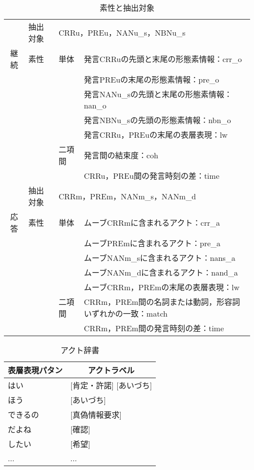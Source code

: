 \begin{description}
\begin{table}[tbt]
 \begin{center}
   \caption{素性と抽出対象}

\begin{tabular}{|c|l|l|l|}
\hline
     & 抽出対象 & \multicolumn{2}{|l|}{CRRu，PREu，NANu\_s，NBNu\_s                                                                                        }\\
\cline{2-2}\cline{3-3}\cline{4-4}継続 & 素性         & 単体        & 
発言CRRuの先頭と末尾の形態素情報：crr\_o\\
&&&発言PREuの末尾の形態素情報：pre\_o\\
&&&発言NANu\_sの先頭と末尾の形態素情報：nan\_o\\
&&&発言NBNu\_sの先頭の形態素情報：nbn\_o\\
&&&発言CRRu，PREuの末尾の表層表現：lw\\
\cline{3-4}
     &          & 二項間          & 
発言間の結束度：coh\\
&&&CRRu，PREu間の発言時刻の差：time\\
\hline
     & 抽出対象 & \multicolumn{2}{|l|}{CRRm，PREm，NANm\_s，NANm\_d                                                                                        }\\
\cline{2-2}\cline{3-3}\cline{4-4}応答 & 素性         & 単体        & 
ムーブCRRmに含まれるアクト：crr\_a\\
&&&ムーブPREmに含まれるアクト：pre\_a\\
&&&ムーブNANm\_sに含まれるアクト：nans\_a\\
&&&ムーブNANm\_dに含まれるアクト：nand\_a\\
&&&ムーブCRRm，PREmの末尾の表層表現：lw\\
\cline{3-4}
     &          & 二項間          & 
CRRm，PREm間の名詞または動詞，形容詞いずれかの一致：match\\
&&&CRRm，PREm間の発言時刻の差：time\\
\hline

\end{tabular}
\label{tbl:features}
\end{center}
\end{table}

\begin{table}[tbt]
\small
  \begin{center}
    \caption{アクト辞書}
    \label{tbl:dic1}
    \begin{tabular}{l|l}
      \hline
      表層表現パタン & \multicolumn{1}{c}{アクトラベル} \\
      \hline
      はい & [肯定・許諾] [あいづち] \\
      ほう & [あいづち] \\
      できるの	& [真偽情報要求] \\
      だよね & [確認]\\
      したい & [希望]\\
      ...&...\\
      \hline
    \end{tabular}
  \end{center}
\end{table}


\end{description}
